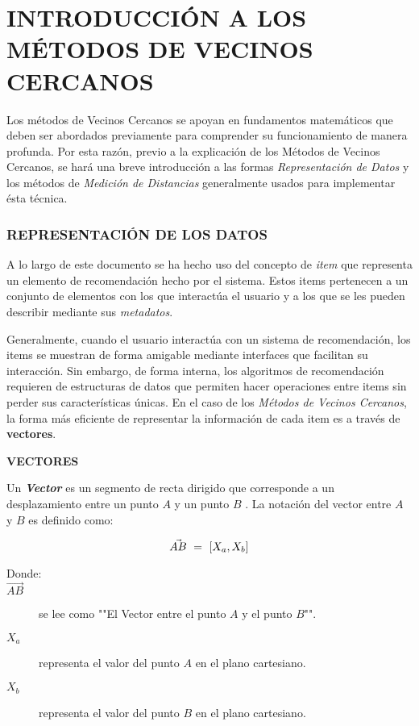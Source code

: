     \section{INTRODUCCIÓN A LOS MÉTODOS DE VECINOS CERCANOS}
    
    Los métodos de Vecinos Cercanos se apoyan en fundamentos matemáticos que deben ser abordados previamente para comprender su funcionamiento de manera profunda. Por esta razón, previo a la explicación de los Métodos de Vecinos Cercanos, se hará una breve introducción a las formas \textit{Representación de Datos} y los métodos de \textit{Medición de Distancias} generalmente usados para implementar ésta técnica.


    \subsubsection{REPRESENTACIÓN DE LOS DATOS}

    A lo largo de este documento se ha hecho uso del concepto de \textit{item} que representa un elemento de recomendación hecho por el sistema.
    Estos items pertenecen a un conjunto de elementos con los que interactúa el usuario y a los que se les pueden describir mediante sus \textit{metadatos}.

    Generalmente, cuando el usuario interactúa con un sistema de recomendación, los items se muestran de forma amigable mediante interfaces que facilitan su interacción. Sin embargo, de forma interna, los algoritmos de recomendación requieren de estructuras de datos que permiten hacer operaciones entre items sin perder sus características únicas. 
    En el caso de los \textit{Métodos de Vecinos Cercanos}, la forma más eficiente de representar la información de cada item es a través de \textbf{vectores}.

    \textbf{VECTORES}

    Un \textit{\textbf{Vector}} es un segmento de recta dirigido que corresponde a un desplazamiento entre un punto $A$ y un punto $B$ \parencite{poole2007álgebra}.
    La notación del vector entre $A$ y $B$ es definido como:

    \begin{equation}
        \vec{AB} \ = \ [X_a, X_b]
        \addequation{Definición de un Vector}
    \end{equation}

    \begin{description}
        \item[Donde:]
        \item[$\vec{AB}$] se lee como ""El Vector entre el punto $A$ y el punto $B$"".
        \item[$X_a$] representa el valor del punto $A$ en el plano cartesiano.
        \item[$X_b$] representa el valor del punto $B$ en el plano cartesiano.  
    \end{description}







